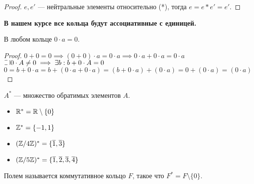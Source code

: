 \begin{normalsize}
\begin{proof}
    $e, e'$ --- нейтральные элементы относительно (*), тогда $e = e * e' = e'$.
\end{proof}

\begin{theorem-non}
    {\textbf{В нашем курсе все кольца будут ассоциативные с единицей.}}
\end{theorem-non}

\begin{lemma}
    В любом кольце $0 \cdot a = 0$.
\end{lemma}
\begin{proof}
    $0 + 0 = 0 \implies (0 + 0) \cdot a = 0 \cdot a \implies 0 \cdot a + 0 \cdot a = 0 \cdot a$\\
    $\letus 0 \cdot A \neq 0 \implies \exists b: b + 0 \cdot A = 0$\\
    $0 = b + 0 \cdot a = b + (0 \cdot a + 0 \cdot a) = (b + 0 \cdot a) + (0 \cdot a) = 0 + (0 \cdot a) = (0 \cdot a)$
\end{proof}

\begin{defn}
    $A^*$ --- множество обратимых элементов $A$.
\end{defn}

\begin{examples}
    \begin{itemize}
        \item $\mathbb{R}^* = \mathbb{R} \setminus \{0\}$
        \item $\mathbb{Z}^* = \{-1, 1\}$
        \item $(\mathbb{Z}/4\mathbb{Z})^* = \{\overline{1}, \overline{3}\}$
        \item $(\mathbb{Z}/5\mathbb{Z})^* = \{\overline{1}, \overline{2}, \overline{3}, \overline{4}\}$
    \end{itemize}
\end{examples}

\begin{defn}
    Полем называется коммутативное кольцо $F$, такое что $F^* = F \setminus \{0\}$.
\end{defn}

\end{normalsize}
